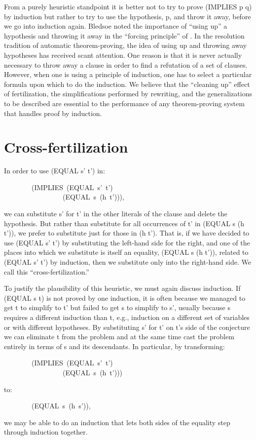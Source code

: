\documentclass[10pt]{book}
\newenvironment{pubasis}{\begin{flushleft}}{\end{flushleft}}
\begin{document}
From a purely heuristic standpoint it is better not to try to prove
(IMPLIES p q) by induction but rather to try to use the
hypothesis, p, and throw it away, before we go into induction again.
Bledsoe noted the importance of ``using up'' a hypothesis 
and throwing it away in the ``forcing principle'' of \cite{BLEDSOELIMIT}.
In the resolution tradition of automatic theorem-proving,
the idea of using up and throwing away hypotheses has received scant
attention.  One reason is that it is never actually
necessary to throw away a clause in order to find a refutation of
a set of clauses.  However, when one is using a principle of induction,
one has to select a particular formula
upon which to do the induction.  We believe
that the ``cleaning up'' effect of fertilization, the simplifications
performed by rewriting, and the generalizations to be described
are essential to the performance of any theorem-proving system that
handles proof by induction.

\section{Cross-fertilization}
In order to use (EQUAL s' t') in:
\begin{pubasis}
~~~~~~~~(IMPLIES~(EQUAL~s'~t')\\
~~~~~~~~~~~~~~~~~(EQUAL~s~(h~t'))),\\
\end{pubasis}
we can substitute s' for t' in the other literals of the clause and
delete the hypothesis.  But rather than substitute for all occurrences
of t' in (EQUAL s (h t')), we prefer to substitute just for those in (h t').
That is, if we have decided to use (EQUAL s' t') by  substituting the left-hand side
for the right, and one of the places into which we substitute is itself an
equality, (EQUAL s (h t')), related to (EQUAL s' t') by induction, then we substitute
only into the right-hand side.  We call this ``cross-fertilization.''

To justify the plausibility of this heuristic, we must again discuss induction.  If (EQUAL s t)
is not proved by one induction, it is often because
we managed to get t to simplify to t' but failed to get s to simplify to s',
 usually because s requires a different induction
than t, e.g., induction on a different set of variables or with different
hypotheses.  By substituting s' for t' on t's side of the conjecture we
can eliminate t from the problem and at the same time cast the problem
entirely in terms of s and its descendants.  In particular, by transforming:
\begin{pubasis}
~~~~~~~~(IMPLIES~(EQUAL~s'~t')\\
~~~~~~~~~~~~~~~~~(EQUAL~s~(h~t')))\\
\end{pubasis}
to:
\begin{pubasis}
~~~~~~~~(EQUAL~s~(h~s')),\\
\end{pubasis}
we may be able to do an induction that lets both sides of the equality
step through induction together.
\end{document}
